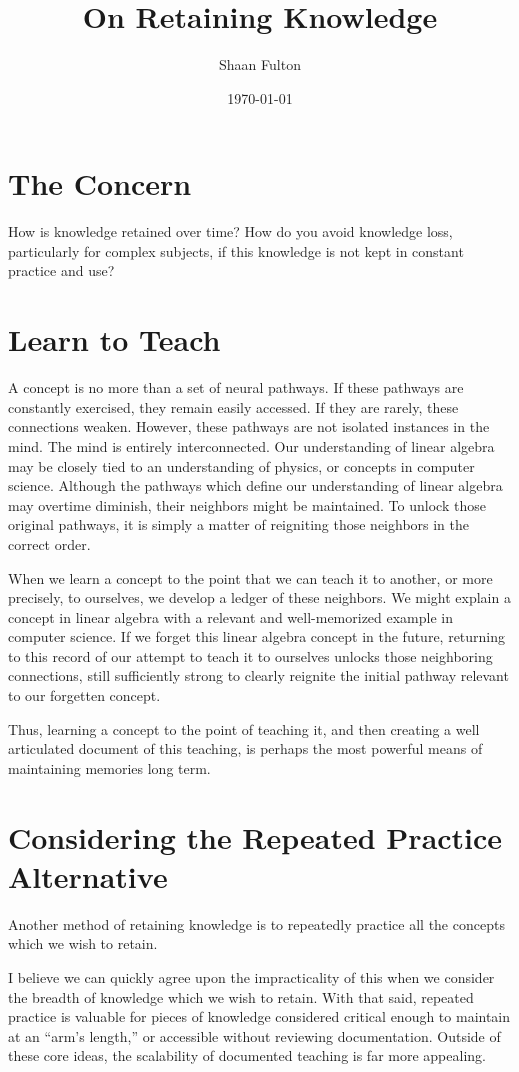 \documentclass[12pt]{article}
\title{On Retaining Knowledge}
\author{Shaan Fulton}
\date{\today}
\begin{document}
\maketitle

\section*{The Concern}

How is knowledge retained over time? How do you avoid knowledge loss, particularly for complex subjects, if this knowledge is not kept in constant practice and use?

\section*{Learn to Teach}

A concept is no more than a set of neural pathways. If these pathways are constantly exercised, they remain easily accessed. If they are rarely, these connections weaken. However, these pathways are not isolated instances in the mind. The mind is entirely interconnected. Our understanding of linear algebra may be closely tied to an understanding of physics, or concepts in computer science. Although the pathways which define our understanding of linear algebra may overtime diminish, their neighbors might be maintained. To unlock those original pathways, it is simply a matter of reigniting those neighbors in the correct order.

When we learn a concept to the point that we can teach it to another, or more precisely, to ourselves, we develop a ledger of these neighbors. We might explain  a concept in linear algebra with a relevant and well-memorized example in computer science. If we forget this linear algebra concept in the future, returning to this record of our attempt to teach it to ourselves unlocks those neighboring connections, still sufficiently strong to clearly reignite the initial pathway relevant to our forgetten concept.

Thus, learning a concept to the point of teaching it, and then creating a well articulated document of this teaching, is perhaps the most powerful means of maintaining memories long term.

\section*{Considering the Repeated Practice Alternative}

Another method of retaining knowledge is to repeatedly practice all the concepts which we wish to retain.

I believe we can quickly agree upon the impracticality of this when we consider the breadth of knowledge which we wish to retain. With that said, repeated practice is valuable for pieces of knowledge considered critical enough to maintain at an ``arm's length,'' or accessible without reviewing documentation. Outside of these core ideas, the scalability of documented teaching is far more appealing.
\end{document}
